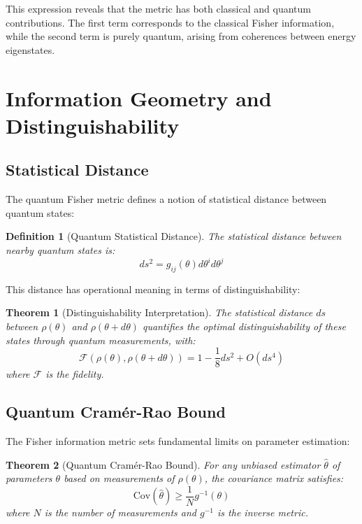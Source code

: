\documentclass[12pt,a4paper]{article}
\newtheorem{definition}{Definition}
\newtheorem{theorem}{Theorem}
\begin{document}
This expression reveals that the metric has both classical and quantum contributions. The first term corresponds to the classical Fisher information, while the second term is purely quantum, arising from coherences between energy eigenstates.

\section{Information Geometry and Distinguishability}

\subsection{Statistical Distance}

The quantum Fisher metric defines a notion of statistical distance between quantum states:

\begin{definition}[Quantum Statistical Distance]
The statistical distance between nearby quantum states is:
\begin{equation}
ds^2 = g_{ij}(\theta)d\theta^i d\theta^j
\end{equation}
\end{definition}

This distance has operational meaning in terms of distinguishability:

\begin{theorem}[Distinguishability Interpretation]
The statistical distance $ds$ between $\rho(\theta)$ and $\rho(\theta + d\theta)$ quantifies the optimal distinguishability of these states through quantum measurements, with:
\begin{equation}
\mathcal{F}(\rho(\theta), \rho(\theta + d\theta)) = 1 - \frac{1}{8}ds^2 + O(ds^4)
\end{equation}
where $\mathcal{F}$ is the fidelity.
\end{theorem}

\subsection{Quantum Cramér-Rao Bound}

The Fisher information metric sets fundamental limits on parameter estimation:

\begin{theorem}[Quantum Cramér-Rao Bound]
For any unbiased estimator $\hat{\theta}$ of parameters $\theta$ based on measurements of $\rho(\theta)$, the covariance matrix satisfies:
\begin{equation}
\text{Cov}(\hat{\theta}) \geq \frac{1}{N}g^{-1}(\theta)
\end{equation}
where $N$ is the number of measurements and $g^{-1}$ is the inverse metric.
\end{theorem}
\end{document}
